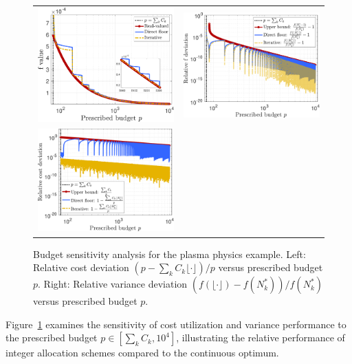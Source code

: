 %
\begin{figure}[!t]\centering
\begin{tabular}{cc}
\includegraphics[width=0.48\linewidth]{./Figures/Eg1_f_p.pdf}&
\includegraphics[width=0.48\linewidth]{./Figures/Eg1_f.pdf}\\
\includegraphics[width=0.48\linewidth]{./Figures/Eg1_Cost.pdf} 
\end{tabular}
\caption{
Budget sensitivity analysis for the plasma physics example. Left: Relative cost deviation $(p - \sum_k C_k \lfloor \cdot \rfloor)/p$ versus prescribed budget $p$. Right: Relative variance deviation $(f(\lfloor \cdot \rfloor) - f(N_k^*))/f(N_k^*)$ versus prescribed budget $p$. 
} 
\label{fig:Eg1} 
\end{figure}
%

Figure~\ref{fig:Eg1} examines the sensitivity of cost utilization and variance performance to the prescribed budget $p \in [\sum_k C_k, 10^4]$, illustrating the relative performance of integer allocation schemes compared to the continuous optimum.

